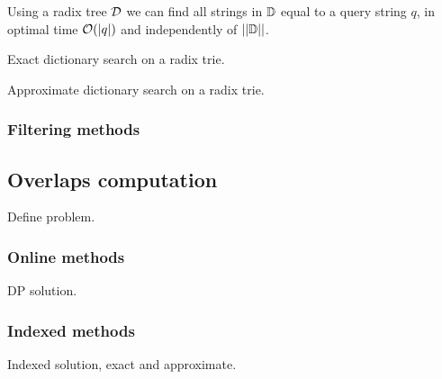 Using a radix tree $\mathcal {D}$ we can find all strings in $\mathbb {D}$ equal to a query string $q$, in optimal time $\mathcal{O}(|q|)$ and independently of $||\mathbb {D}||$.

\begin{algorithm}[h]
\caption{Exact dictionary search on a radix trie.}
\label{alg:dict-exact}
\end{algorithm}

\begin{algorithm}[h]
\caption{Approximate dictionary search on a radix trie.}
\label{alg:dict-edit}
\end{algorithm}

\subsubsection{Filtering methods}



\subsection{Overlaps computation}

Define problem.

\subsubsection{Online methods}

DP solution.

\subsubsection{Indexed methods}

Indexed solution, exact and approximate.
